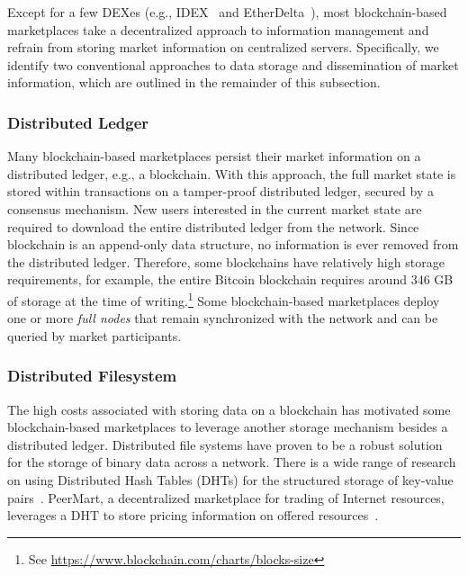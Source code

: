 Except for a few DEXes (e.g., IDEX~\cite{idex} and EtherDelta~\cite{etherdelta}), most blockchain-based marketplaces take a decentralized approach to information management and refrain from storing market information on centralized servers.
Specifically, we identify two conventional approaches to data storage and dissemination of market information, which are outlined in the remainder of this subsection.

\subsubsection{Distributed Ledger}
Many blockchain-based marketplaces persist their market information on a distributed ledger, e.g., a blockchain.
With this approach, the full market state is stored within transactions on a tamper-proof distributed ledger, secured by a consensus mechanism.
New users interested in the current market state are required to download the entire distributed ledger from the network.
Since blockchain is an append-only data structure, no information is ever removed from the distributed ledger.
Therefore, some blockchains have relatively high storage requirements, for example, the entire Bitcoin blockchain requires around 346 GB of storage at the time of writing.\footnote{See \url{https://www.blockchain.com/charts/blocks-size}}
Some blockchain-based marketplaces deploy one or more \emph{full nodes} that remain synchronized with the network and can be queried by market participants.

\subsubsection{Distributed Filesystem}
The high costs associated with storing data on a blockchain has motivated some blockchain-based marketplaces to leverage another storage mechanism besides a distributed ledger.
Distributed file systems have proven to be a robust solution for the storage of binary data across a network.
There is a wide range of research on using Distributed Hash Tables (DHTs) for the structured storage of key-value pairs~\cite{maymounkov2002kademlia}.
PeerMart, a decentralized marketplace for trading of Internet resources, leverages a DHT to store pricing information on offered resources~\cite{hausheer2006peermart}.

